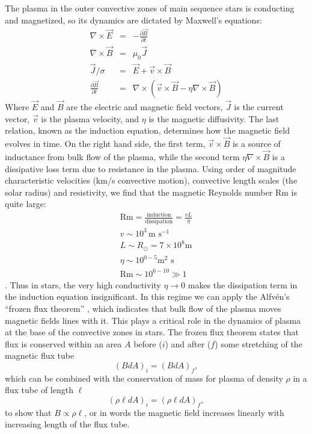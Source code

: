 The plasma in the outer convective zones of main sequence stars is conducting and magnetized, so its dynamics are dictated by Maxwell's equations: 
\begin{eqnarray}
\nabla \times \vec{E} &=& -\frac{\partial \vec{B}}{\partial t}\\
\nabla \times \vec{B} &=& \mu_0 \vec{J}\\
\vec{J}/\sigma &=& \vec{E} + \vec{v} \times \vec{B}\\
\frac{\partial \vec{B}}{\partial t} &=& \nabla \times \left( \vec{v} \times \vec{B} - \eta \nabla \times \vec{B} \right)
\end{eqnarray}
Where $\vec{E}$ and $\vec{B}$ are the electric and magnetic field vectors, $\vec{J}$ is the current vector, $\vec{v}$ is the plasma velocity, and $\eta$ is the magnetic diffusivity. The last relation, known as the induction equation, determines how the magnetic field evolves in time. On the right hand side, the first term, $\vec{v} \times \vec{B}$ is a source of inductance from bulk flow of the plasma, while the second term $\eta \nabla \times \vec{B}$ is a dissipative loss term due to resistance in the plasma. Using order of magnitude characteristic velocities (km/s convective motion), convective length scales (the solar radius) and resistivity, we find that the magnetic Reynolds number Rm is quite large:
\begin{eqnarray}
\textrm{Rm} = \frac{\textrm{induction}}{\textrm{dissipation}} = \frac{v L}{\eta}\\
v \sim 10^3\, \textrm{m s}^{-1}\\
L \sim R_\odot = 7 \times 10^8 \textrm{m}\\
\eta \sim 10^{0-5} \textrm{m$^2$ s}\\
\textrm{Rm} \sim 10^{6 - 10} \gg 1
\end{eqnarray}
\citep{Ossendrijver2003}. Thus in stars, the very high conductivity $\eta \rightarrow 0$ makes the dissipation term in the induction equation insignificant. In this regime we can apply the Alfv{\'e}n's ``frozen flux theorem'' \citep{Alfven1942}, which indicates that bulk flow of the plasma moves magnetic fields lines with it. This plays a critical role in the dynamics of plasma at the base of the convective zones in stars. The frozen flux theorem states that flux is conserved within an area $A$ before ($i$) and after ($f$) some stretching of the magnetic flux tube  
\begin{equation}
(B dA)_i = (B dA)_f,
\end{equation}
which can be combined with the conservation of mass for plasma of density $\rho$ in a flux tube of length $\ell$
\begin{equation}
(\rho \ell dA)_i = (\rho \ell dA)_f,
\end{equation}
to show that $B \propto \rho \ell$, or in words the magnetic field increases linearly with increasing length of the flux tube.

